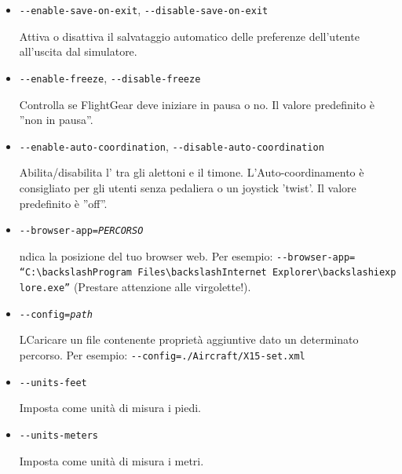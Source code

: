 {\begin{itemize}
  \item{\texttt{-$ $-enable-save-on-exit}, \texttt{-$ $-disable-save-on-exit}}

    Attiva o disattiva il salvataggio automatico delle preferenze
    dell'utente all'uscita dal simulatore.

  \item{\texttt{-$ $-enable-freeze}, \texttt{-$ $-disable-freeze}}

    Controlla se FlightGear deve iniziare in pausa o no. Il valore
    predefinito \`{e} ''non in pausa''.

  \item{\texttt{-$ $-enable-auto-coordination}, \texttt{-$ $-disable-auto-coordination}}

    Abilita/disabilita l' tra gli alettoni e il timone.
    L'Auto-coordinamento \`{e} consigliato per gli utenti senza pedaliera
    o un joystick 'twist'. Il valore predefinito \`{e} ''off''.

  \item{\texttt{-$ $-browser-app={\it PERCORSO}}}

    ndica la posizione del tuo browser web. Per esempio:
    \texttt{-$ $-browser-app=}\\
    \texttt{``C:$\backslash$Program~Files$\backslash$Internet~Explorer$\backslash$iexplore.exe''}
    (Prestare attenzione alle virgolette!).

  \item{\texttt{-$ $-config={\it path}}}

    LCaricare un file contenente propriet\`{a} aggiuntive dato un determinato percorso. Per esempio:
    \texttt{-$ $-config=./Aircraft/X15-set.xml}

  \item{\texttt{-$ $-units-feet}}

    Imposta come unit\`{a} di misura i piedi.

  \item{\texttt{-$ $-units-meters}}

    Imposta come unit\`{a} di misura i metri.


  \end{itemize}
}

